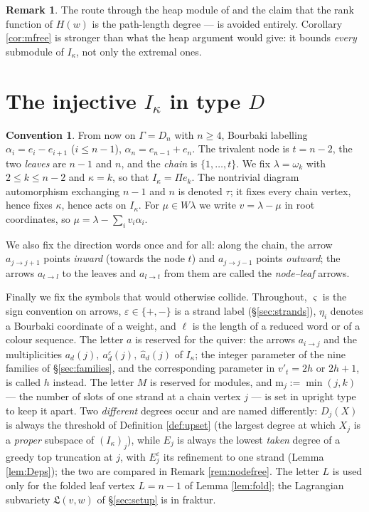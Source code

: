 \documentclass[reqno]{amsart}
\theoremstyle{plain}
\theoremstyle{definition}
\newtheorem{remark}[theorem]{Remark}
\newtheorem{convention}[theorem]{Convention}
\newcommand{\la}{\lambda}
\newcommand{\al}{\alpha}
\newcommand{\om}{\omega}
\newcommand{\ka}{\kappa}
\newcommand{\Pia}{\Pi}
\newcommand{\eps}{\varepsilon}
\newcommand{\ms}{\mathrm{m}}
\begin{document}
\begin{remark}
The route through the heap module of \cite[\S3]{DEKM} and the
claim that the rank function of $H(w)$ is the path-length degree --- is
avoided entirely.  Corollary \ref{cor:mfree} is stronger than what the heap
argument would give: it bounds \emph{every} submodule of $I_\ka$, not only the
extremal ones.
\end{remark}


\section{The injective \texorpdfstring{$I_\ka$}{I} in type \texorpdfstring{$D$}{D}}
\label{sec:profile}

\begin{convention}\label{conv:D}
From now on $\Gamma=D_n$ with $n\ge4$, Bourbaki labelling
$\al_i=e_i-e_{i+1}$ ($i\le n-1$), $\al_n=e_{n-1}+e_n$.  The trivalent node is
$t=n-2$, the two \emph{leaves} are $n-1$ and $n$, and the \emph{chain} is
$\{1,\dots,t\}$.  We fix $\la=\om_k$ with $2\le k\le n-2$ and $\ka=k$, so that
$I_\ka=\Pia e_k$.  The nontrivial diagram automorphism exchanging $n-1$ and $n$
is denoted $\tau$; it fixes every chain vertex, hence fixes $\ka$, hence acts
on $I_\ka$.  For $\mu\in W\la$ we write $v=\la-\mu$ in root coordinates, so
$\mu=\la-\sum_iv_i\al_i$.

We also fix the direction words once and for all: along the chain, the arrow
$a_{j\to j+1}$ points \emph{inward} (towards the node $t$) and $a_{j\to j-1}$
points \emph{outward}; the arrows $a_{t\to l}$ to the leaves and $a_{l\to t}$
from them are called the \emph{node--leaf} arrows.

Finally we fix the symbols that would otherwise collide.  Throughout,
$\varsigma$ is the sign convention on arrows, $\eps\in\{+,-\}$ is a strand
label (\S\ref{sec:strands}), $\eta_i$ denotes a Bourbaki coordinate of a
weight, and $\ell$ is the length of a reduced word or of a colour sequence.
The letter $a$ is reserved for the quiver: the arrows $a_{i\to j}$ and the
multiplicities $a_d(j),\ a^{\eps}_d(j),\ \hat a_d(j)$ of $I_\ka$; the integer
parameter of the nine families of \S\ref{sec:families}, and the corresponding
parameter in $v'_t=2h$ or $2h+1$, is called $h$ instead.  The letter $M$ is
reserved for modules, and $\ms_j:=\min(j,k)$ --- the number of slots of one
strand at a chain vertex $j$ --- is set in upright type to keep it apart.
Two \emph{different} degrees occur and are named differently: $D_j(X)$ is
always the threshold of Definition \ref{def:upset} (the largest degree at
which $X_j$ is a \emph{proper} subspace of $(I_\ka)_j$), while $E_j$ is always
the lowest \emph{taken} degree of a greedy top truncation at $j$, with
$E^{\eps}_j$ its refinement to one strand (Lemma \ref{lem:Deps}); the two are
compared in Remark \ref{rem:nodefree}.  The letter $L$ is used only for the
folded leaf vertex $L=n-1$ of Lemma \ref{lem:fold}; the Lagrangian
subvariety $\mathfrak{L}(v,w)$ of \S\ref{sec:setup} is in fraktur.


\end{convention}
\end{document}
